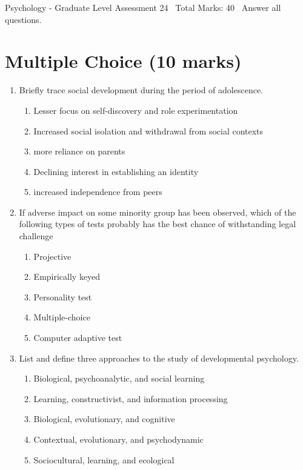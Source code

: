 \documentclass[12pt]{article}
\begin{document}
\begin{center}
Psychology - Graduate Level Assessment 24 \
Total Marks: 40 \
Answer all questions.
\end{center}

\section*{Multiple Choice (10 marks)}
\begin{enumerate}[label=\arabic*.]
\item Briefly trace social development during the period of adolescence.
\begin{enumerate}[label=(\alph*)]
    \item Lesser focus on self-discovery and role experimentation
    \item Increased social isolation and withdrawal from social contexts
    \item more reliance on parents
    \item Declining interest in establishing an identity
    \item increased independence from peers
\end{enumerate}
\item If adverse impact on some minority group has been observed, which of the following types of tests probably has the best chance of withstanding legal challenge
\begin{enumerate}[label=(\alph*)]
    \item Projective
    \item Empirically keyed
    \item Personality test
    \item Multiple-choice
    \item Computer adaptive test
\end{enumerate}
\item List and define three approaches to the study of developmental psychology.
\begin{enumerate}[label=(\alph*)]
    \item Biological, psychoanalytic, and social learning
    \item Learning, constructivist, and information processing
    \item Biological, evolutionary, and cognitive
    \item Contextual, evolutionary, and psychodynamic
    \item Sociocultural, learning, and ecological
\end{enumerate}

\end{enumerate}
\end{document}
